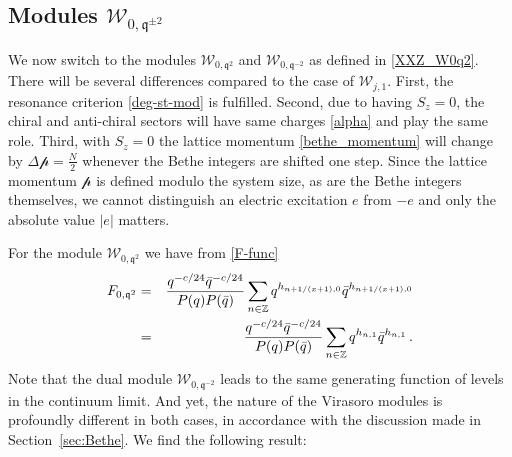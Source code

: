 \documentclass[a4paper,10pt]{article}
\newcommand{\q}{\mathfrak{q}}
\newcommand{\linnea}[1]{$\framebox{\tiny L}$\ \textbf{\texttt{{\color{red}\footnotesize#1}}}}
\newcommand{\jesper}[1]{$\framebox{\tiny J}$\ \textbf{\texttt{{\color{cyan}\footnotesize#1}}}}
\newcommand{\aSt}{\mathcal{W}}
\newcommand{\AStTL}[2]{\aSt_{#1,#2}}
\newcommand{\FN}{F}
\newcommand{\Pscaled}{{\mathcal p}}
\begin{document}


\subsection{Modules  $\AStTL{0}{\q^{\pm2}}$}\label{Warmup}


We now switch to the modules $\AStTL{0}{\q^{2}}$  and  $\AStTL{0}{\q^{-2}}$ as defined in \eqref{XXZ_W0q2}. There will be several differences compared to the case of $\AStTL{j}{1}$. First, the resonance criterion \eqref{deg-st-mod} is fulfilled. Second, due to having $S_z=0$, the chiral and anti-chiral sectors will have same charges \eqref{alpha} and play the same role. Third, with $S_z=0$ the lattice momentum \eqref{bethe_momentum} will change by $\Delta \Pscaled = \frac{N}{2}$ whenever the Bethe integers are shifted one step. Since the lattice momentum $\Pscaled$ is defined modulo the system size, as are the Bethe integers themselves, we cannot distinguish an electric excitation $e$ from $-e$ and only the absolute value $|e|$ matters. 


For the module  $\AStTL{0}{\q^{2}}$ we have from \eqref{F-func}
%
\begin{eqnarray}
\FN_{0,\q^{2}}&=&{q^{-c/24}\bar{q}^{-c/24}\over P(q)P(\bar{q})}\sum_{n\in  \mathbb{Z} }q^{h_{n+1/(x+1),0}}\bar{q}^{h_{n+1/(x+1),0}}\nonumber\\
&=& {q^{-c/24}\bar{q}^{-c/24}\over P(q)P(\bar{q})}\sum_{n\in   \mathbb{Z} }q^{h_{n,1}}\bar{q}^{h_{n,1}} \,.
\end{eqnarray}
%
Note that the dual module $\AStTL{0}{\q^{-2}}$ %
leads to the same generating function of levels in the continuum limit. And yet, the nature of the Virasoro modules is profoundly different in both cases, in accordance with the discussion made in Section~\ref{sec:Bethe}. We find the following result: %
%

\end{document}
